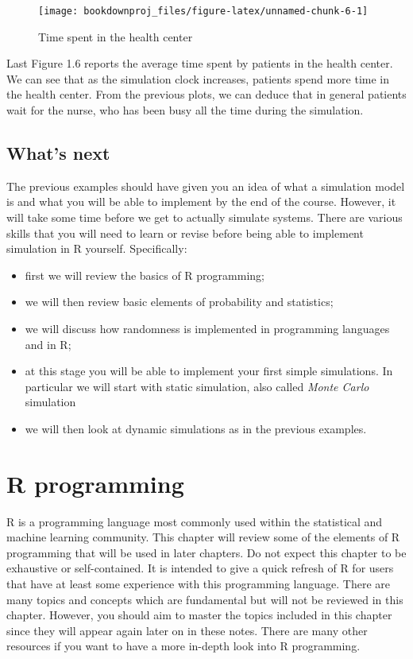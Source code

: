 \documentclass[
]{book}
\begin{document}
\begin{figure}

{\centering \texttt{[image: bookdownproj\_files/figure-latex/unnamed-chunk-6-1]} 

}

\caption{Time spent in the health center}\label{fig:unnamed-chunk-6}
\end{figure}

Last Figure 1.6 reports the average time spent by patients in the health center. We can see that as the simulation clock increases, patients spend more time in the health center. From the previous plots, we can deduce that in general patients wait for the nurse, who has been busy all the time during the simulation.

\hypertarget{whats-next}{%
\section{What's next}\label{whats-next}}

The previous examples should have given you an idea of what a simulation model is and what you will be able to implement by the end of the course. However, it will take some time before we get to actually simulate systems. There are various skills that you will need to learn or revise before being able to implement simulation in R yourself. Specifically:

\begin{itemize}
\item
  first we will review the basics of R programming;
\item
  we will then review basic elements of probability and statistics;
\item
  we will discuss how randomness is implemented in programming languages and in R;
\item
  at this stage you will be able to implement your first simple simulations. In particular we will start with static simulation, also called \emph{Monte Carlo} simulation
\item
  we will then look at dynamic simulations as in the previous examples.
\end{itemize}

\hypertarget{r-programming}{%
\chapter{R programming}\label{r-programming}}

R is a programming language most commonly used within the statistical and machine learning community. This chapter will review some of the elements of R programming that will be used in later chapters. Do not expect this chapter to be exhaustive or self-contained. It is intended to give a quick refresh of R for users that have at least some experience with this programming language. There are many topics and concepts which are fundamental but will not be reviewed in this chapter. However, you should aim to master the topics included in this chapter since they will appear again later on in these notes. There are many other resources if you want to have a more in-depth look into R programming.
\end{document}
